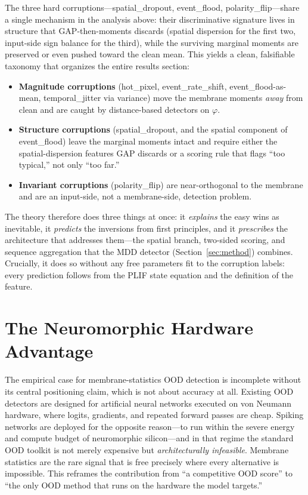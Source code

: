 The three hard corruptions---spatial\_dropout, event\_flood, polarity\_flip---share a single
mechanism in the analysis above: their discriminative signature lives in structure that
GAP-then-moments discards (spatial dispersion for the first two, input-side sign balance for
the third), while the surviving marginal moments are preserved or even pushed toward the
clean mean. This yields a clean, falsifiable taxonomy that organizes the entire results
section:
%
\begin{itemize}
  \item \textbf{Magnitude corruptions} (hot\_pixel, event\_rate\_shift, event\_flood-as-mean,
        temporal\_jitter via variance) move the membrane moments \emph{away} from clean and
        are caught by distance-based detectors on $\varphi$.
  \item \textbf{Structure corruptions} (spatial\_dropout, and the spatial component of
        event\_flood) leave the marginal moments intact and require either the
        spatial-dispersion features GAP discards or a scoring rule that flags ``too
        typical,'' not only ``too far.''
  \item \textbf{Invariant corruptions} (polarity\_flip) are near-orthogonal to the membrane
        and are an input-side, not a membrane-side, detection problem.
\end{itemize}
%
The theory therefore does three things at once: it \emph{explains} the easy wins as
inevitable, it \emph{predicts} the inversions from first principles, and it \emph{prescribes}
the architecture that addresses them---the spatial branch, two-sided scoring, and sequence
aggregation that the MDD detector (Section~\ref{sec:method}) combines. Crucially, it does so
without any free parameters fit to the corruption labels: every prediction follows from the
PLIF state equation and the definition of the feature.

\section{The Neuromorphic Hardware Advantage}
\label{sec:hardware}

The empirical case for membrane-statistics OOD detection is incomplete without its central
positioning claim, which is not about accuracy at all. Existing OOD detectors are designed
for artificial neural networks executed on von Neumann hardware, where logits, gradients, and
repeated forward passes are cheap. Spiking networks are deployed for the opposite reason---to
run within the severe energy and compute budget of neuromorphic silicon---and in that regime
the standard OOD toolkit is not merely expensive but \emph{architecturally infeasible}.
Membrane statistics are the rare signal that is free precisely where every alternative is
impossible. This reframes the contribution from ``a competitive OOD score'' to ``the only OOD
method that runs on the hardware the model targets.''

